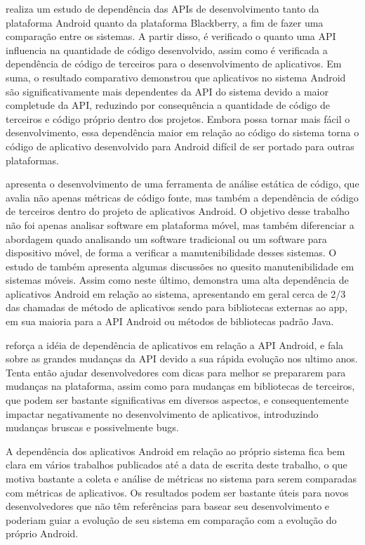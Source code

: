   realiza um estudo de dependência das APIs de desenvolvimento tanto da plataforma Android quanto da plataforma Blackberry, a fim de fazer uma comparação entre os sistemas. A partir disso, é verificado o quanto uma API influencia na quantidade de código desenvolvido, assim como é verificada a dependência de código de terceiros para o desenvolvimento de aplicativos. Em suma, o resultado comparativo demonstrou que aplicativos no sistema Android são significativamente mais dependentes da API do sistema devido a maior completude da API, reduzindo por consequência a quantidade de código de terceiros e código próprio dentro dos projetos. Embora possa tornar mais fácil o desenvolvimento, essa dependência maior em relação ao código do sistema torna o código de aplicativo desenvolvido para Android difícil de ser portado para outras plataformas.

 apresenta o desenvolvimento de uma ferramenta de análise estática de código, que avalia não apenas métricas de código fonte, mas também a dependência de código de terceiros dentro do projeto de aplicativos Android. O objetivo desse trabalho não foi apenas analisar software em plataforma móvel, mas também diferenciar a abordagem quado analisando um software tradicional ou um software para dispositivo móvel, de forma a verificar a manutenibilidade desses sistemas. O estudo de  também apresenta algumas discussões no quesito manutenibilidade em sistemas móveis. Assim como neste último,  demonstra uma alta dependência de aplicativos Android em relação ao sistema, apresentando em geral cerca de  2/3 das chamadas de método de aplicativos sendo para bibliotecas externas ao app, em sua maioria para a API Android ou métodos de bibliotecas padrão Java.

 reforça a idéia de dependência de aplicativos em relação a API Android, e fala sobre as grandes mudanças da API devido a sua rápida evolução nos ultimo anos. Tenta então ajudar desenvolvedores com dicas para melhor se prepararem para mudanças na plataforma, assim como para mudanças em bibliotecas de terceiros, que podem ser bastante significativas em diversos aspectos, e consequentemente impactar negativamente no desenvolvimento de aplicativos, introduzindo mudanças bruscas e possivelmente bugs.

A dependência dos aplicativos Android em relação ao próprio sistema fica bem clara em vários trabalhos publicados até a data de escrita deste trabalho, o que motiva bastante a coleta e análise de métricas no sistema para serem comparadas com métricas de aplicativos. Os resultados podem ser bastante úteis para novos desenvolvedores que não têm referências para basear seu desenvolvimento e poderiam guiar a evolução de seu sistema em comparação com a evolução do próprio Android.

